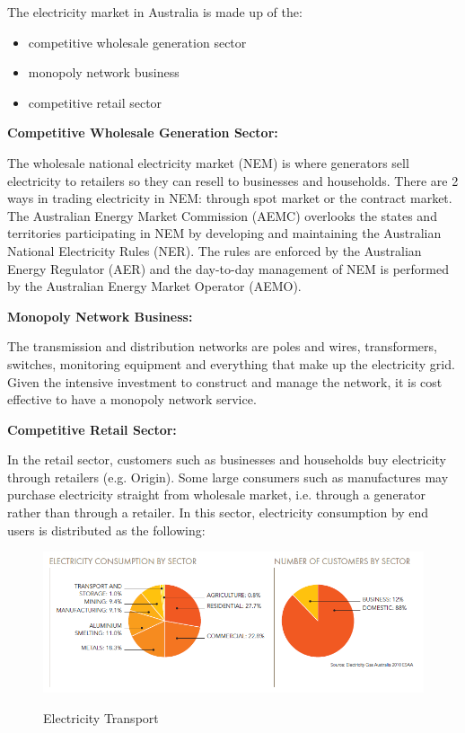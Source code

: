 \documentclass[12pt]{article}
\begin{document}
\begin{flushleft}
The electricity market in Australia is made up of the:
\begin{itemize}
 \item competitive wholesale generation sector
 \item monopoly network business
 \item competitive retail sector\parencite{aemc2}
\end{itemize}
{\textbf{\large Competitive Wholesale Generation Sector:}}\par
The wholesale national electricity market (NEM) is where generators sell electricity to retailers so they can resell to businesses and households. There are 2 ways in trading electricity in NEM: through spot market or the contract market.\parencite{aemc2} The Australian Energy Market Commission (AEMC) overlooks the states and territories participating in NEM by developing and maintaining the Australian National Electricity Rules (NER). The rules are enforced by the Australian Energy Regulator (AER) and the day-to-day management of NEM is performed by the Australian Energy Market Operator (AEMO).\parencite{aemo1} \par
{\textbf{\large Monopoly Network Business:}}\par
The transmission and distribution networks are poles and wires, transformers, switches, monitoring equipment and everything that make up the electricity grid. Given the intensive investment to construct and manage the network, it is cost effective to have a monopoly network service.\parencite{aemc2}\par
{\textbf{\large Competitive Retail Sector:}}\par
In the retail sector, customers such as businesses and households buy electricity through retailers (e.g. Origin). Some large consumers such as manufactures may purchase electricity straight from wholesale market, i.e. through a generator rather than through a retailer.\parencite{aemc2} In this sector, electricity consumption by end users is distributed as the following:
\begin{figure}[!h]
  \centering
  \includegraphics[width=\textwidth]{electricity_consumption.PNG}
    \caption{Electricity Transport}
    \parencite{aemo2}
\end{figure}
\end{flushleft}
\newpage
\end{document}
